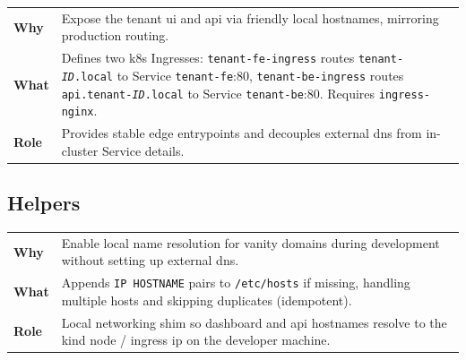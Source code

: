 \documentclass[11pt, a4paper, oneside, listof=totoc]{scrartcl}
\makeatletter
\newcommand{\codesummary}[3]{%
    \vspace{0.4\baselineskip}%
    \noindent\begin{tabularx}{\linewidth}{@{}>{\bfseries}l X@{}}
    Why  & #1\\
    What & #2\\
    Role & #3\\
    \end{tabularx}%
    \vspace{0.2\baselineskip}%
}
\makeatother
\begin{document}
        \clearpage

                \codesummary
                    {Expose the tenant \gls{ui} and \gls{api} via friendly local hostnames, mirroring production routing.}
                    {Defines two \gls{k8s} Ingresses: \texttt{tenant-fe-ingress} routes \texttt{tenant-\textit{ID}.local} to Service \texttt{tenant-fe}:80, \texttt{tenant-be-ingress} routes \texttt{api.tenant-\textit{ID}.local} to Service \texttt{tenant-be}:80. Requires \texttt{ingress-nginx}.}
                    {Provides stable edge entrypoints and decouples external \gls{dns} from in-cluster Service details.}

        \clearpage

            \subsection{Helpers}
                \codesummary
                    {Enable local name resolution for vanity domains during development without setting up external \gls{dns}.}
                    {Appends \texttt{IP HOSTNAME} pairs to \texttt{/etc/hosts} if missing, handling multiple hosts and skipping duplicates (idempotent).}
                    {Local networking shim so dashboard and \gls{api} hostnames resolve to the \gls{kind} node / \gls{ingress} \gls{ip} on the developer machine.}
\end{document}
